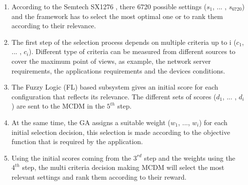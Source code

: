 \begin{enumerate}
\item According to the Semtech SX1276  \cite{lorasemtech},
	there  6720 possible settings ($s_{1}$, ... , $s_{6720}$) and the framework has to select the most optimal one or to rank them according to their relevance.
\item The first step of the selection process depends on multiple criteria up to i ($c_{1}$, ... , $c_{i}$).
	Different type of criteria can be measured from different sources to cover the maximum point of views,
	as  example,
	the network server requirements,
	the applications requirements and the devices conditions.
\item The Fuzzy Logic (FL) based subsystem gives an initial score for each configuration that reflects its relevance.
The different sets of scores ($d_{1}$, ... , $d_{i}$) are sent to the \ac{MCDM} in the $5^{th}$ step.
\item At the same time,
	the \ac{GA} \cite{alkhawlani_access_2008} assigns a suitable weight ($w_{1}$, ..., $w_{i}$) for each initial selection decision,
	this selection is made according to the objective function that is required by the application.
\item Using the initial scores coming from the $3^{rd}$ step and the weights using the $4^{th}$ step,
	the multi criteria decision making{} \ac{MCDM} will select the most relevant settings and rank them according to their reward.
\end{enumerate}

